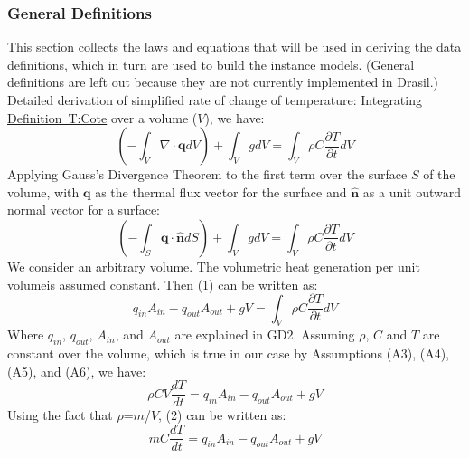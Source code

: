 \documentclass[12pt]{article}
\begin{document}
\subsubsection{General Definitions}
\label{Sec:GD}
This section collects the laws and equations that will be used in deriving the data definitions, which in turn are used to build the instance models. (General definitions are left out because they are not currently implemented in Drasil.)
Detailed derivation of simplified rate of change of temperature:
Integrating \hyperref[T:Cote]{Definition~T:Cote} over a volume ($V$), we have:
\begin{equation}
(-\int_{V}{\nabla{}\cdot{}\mathbf{q}dV})+\int_{V}{gdV}=\int_{V}{\rho{}C\frac{\partial{}T}{\partial{}t}dV}
\end{equation}
Applying Gauss's Divergence Theorem to the first term over the surface $S$ of the volume, with $\mathbf{q}$ as the thermal flux vector for the surface and $\mathbf{\hat{n}}$ as a unit outward normal vector for a surface:
\begin{equation}
(-\int_{S}{\mathbf{q}\cdot{}\mathbf{\hat{n}}dS})+\int_{V}{gdV}=\int_{V}{\rho{}C\frac{\partial{}T}{\partial{}t}dV}
\end{equation}
We consider an arbitrary volume. The volumetric heat generation per unit volumeis assumed constant. Then (1) can be written as:
\begin{equation}
q_{in}A_{in}-q_{out}A_{out}+gV=\int_{V}{\rho{}C\frac{\partial{}T}{\partial{}t}dV}
\end{equation}
Where $q_{in}$, $q_{out}$, $A_{in}$, and $A_{out}$ are explained in GD2. Assuming $\rho{}$, $C$ and $T$ are constant over the volume, which is true in our case by Assumptions (A3), (A4), (A5), and (A6), we have:
\begin{equation}
\rho{}CV\frac{dT}{dt}=q_{in}A_{in}-q_{out}A_{out}+gV
\end{equation}
Using the fact that $\rho{}$=$m$/$V$, (2) can be written as:
\begin{equation}
mC\frac{dT}{dt}=q_{in}A_{in}-q_{out}A_{out}+gV
\end{equation}
\end{document}
